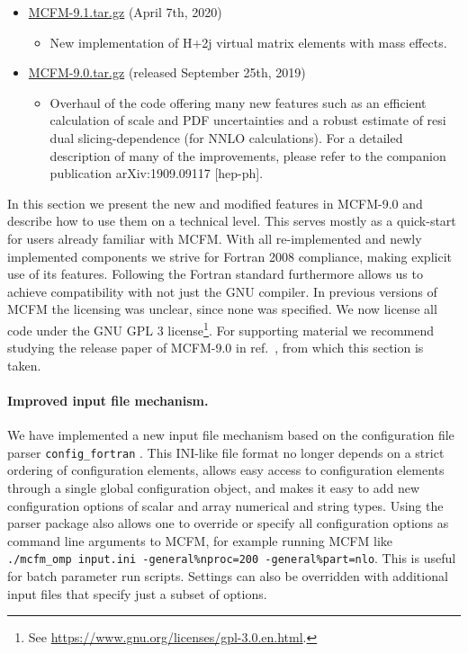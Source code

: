 \label{mcfm9plus}
\label{MCFM9download}
\begin{itemize}
\item \href{https://mcfm.fnal.gov/downloads/MCFM-9.1.tar.gz}{MCFM-9.1.tar.gz} (April 7th, 2020)

\begin{itemize}
\item New implementation of H+2j virtual matrix elements with mass effects.
\end{itemize}

\item \href{https://mcfm.fnal.gov/downloads/MCFM-9.0.tar.gz}{MCFM-9.0.tar.gz} (released September 25th, 2019)

\begin{itemize}
\item Overhaul of the code offering many new features such as an efficient calculation of scale and PDF uncertainties and a robust estimate of resi dual slicing-dependence (for NNLO calculations). For a detailed description of many of the improvements, please refer to the companion publication arXiv:1909.09117 [hep-ph]. 
\end{itemize}
\end{itemize}


In this section we present the new and modified features in MCFM-9.0 and describe how to use them on a technical 
level. This serves mostly as a quick-start for users already familiar with MCFM. With all re-implemented and newly 
implemented components we strive for Fortran 2008 compliance, making explicit 
use of its features. Following the Fortran standard furthermore allows us to achieve compatibility with not just the 
GNU compiler. In previous versions of MCFM the licensing was unclear, since none was specified. We now license all 
code under the GNU GPL 3 license\footnote{See \url{https://www.gnu.org/licenses/gpl-3.0.en.html}.}.
For supporting 
material we recommend studying the release paper of MCFM-9.0 in ref.~\cite{MCFM9}, from which this section is taken.

\paragraph{Improved input file mechanism.}

We have implemented a new input file mechanism based on the configuration file parser \texttt{config\_fortran} 
\cite{JTeunis}.
This INI-like file format no longer depends on a strict ordering of configuration elements, allows easy access to
configuration elements through a single global configuration object, and makes it easy to add new configuration
options of scalar and array numerical and string types. Using the parser package also allows one
to override or specify all configuration options as command line arguments to MCFM, for example running
MCFM like \texttt{./mcfm\_omp input.ini -general\%nproc=200 -general\%part=nlo}. This is useful for batch
parameter run scripts. Settings can also be overridden with additional input files that specify just a subset of 
options.

